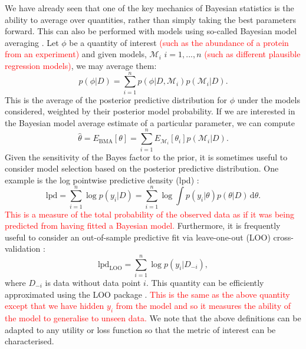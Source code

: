 \documentclass[12pt,english, journal=jpr, layout=twocolumn]{article}
\begin{document}
We have already seen that one of the key mechanics of Bayesian statistics is the ability to average over quantities, rather than simply taking the best parameters forward. This can also be performed with models using so-called Bayesian model averaging \citep{Raftery::1997}. Let $\phi$ be a quantity of interest \textcolor{red}{(such as the abundance of a protein from an experiment)} and given models, $\mathcal{M}_i$ $i = 1,..., n$ \textcolor{red}{(such as different plausible regression models)}, we may average them:
\begin{equation}
p(\phi|D) = \sum_{i = 1}^{n}p(\phi|D, \mathcal{M}_i)p(\mathcal{M}_i|D).
\end{equation}
This is the average of the posterior predictive distribution for $\phi$ under the models considered, weighted by their posterior model probability. If we are interested in the Bayesian model average estimate of a particular parameter, we can compute
\begin{equation}
\hat{\theta} = E_{\text{BMA}}[\theta] = \sum_{i = 1}^{n}E_{\mathcal{M}_i}[\theta_i] p(\mathcal{M}_i|D).
\end{equation}
Given the sensitivity of the Bayes factor to the prior, it is sometimes useful to consider model selection based on the posterior predictive distribution. One example is the log pointwise predictive density (lpd) \citep{Vehtari::2017}:
\begin{equation}
\text{lpd} = \sum_{i = 1}^n \log p(y_i|D) = \sum_{i = 1}^n \log \int p(y_i|\theta)p(\theta|D)\, \text{d}\theta.
\end{equation}
\textcolor{red}{This is a measure of the total probability of the observed data as if it was being predicted from having fitted a Bayesian model.} Furthermore, it is frequently useful to consider an out-of-sample predictive fit via leave-one-out (LOO) cross-validation \citep{Vehtari::2017}:
\begin{equation}
\text{lpd}_\text{LOO} = \sum_{i = 1}^{n}\log p(y_i| D_{-i}),
\end{equation}
where $D_{-i}$ is data without data point $i$. This quantity can be efficiently approximated using the LOO package \citep{Vehtari::2017}. \textcolor{red}{This is the same as the above quantity except that we have hidden $y_i$ from the model and so it measures the ability of the model to generalise to unseen data.} We note that the above definitions can be adapted to any utility or loss function so that the metric of interest can be characterised.
\end{document}
